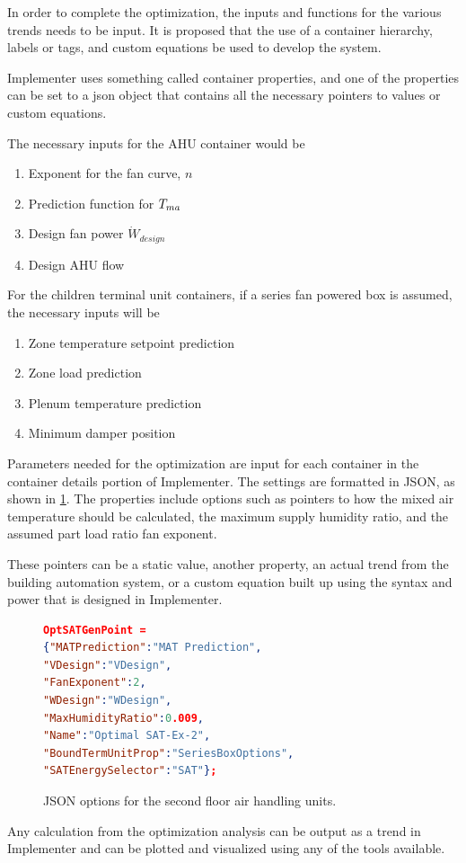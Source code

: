 In order to complete the optimization, the inputs and functions for the
various trends needs to be input. It is proposed that the use of a
container hierarchy, labels or tags, and custom equations be used to
develop the system.

Implementer uses something called container properties, and one of the
properties can be set to a json object that contains all the necessary
pointers to values or custom equations.

The necessary inputs for the AHU container would be 
\begin{enumerate}
    \item Exponent for the fan curve, \(n\)
    \item Prediction function for \(T_{ma}{}\) 
    \item Design fan power \(\dot{W}_{design}\)
    \item Design AHU flow 
\end{enumerate}
For the children terminal unit containers, if a series fan powered box
is assumed, the necessary inputs will be
\begin{enumerate}
    \item Zone temperature setpoint prediction
    \item Zone load prediction
    \item Plenum temperature prediction
    \item Minimum damper position
\end{enumerate}

Parameters needed for the optimization are input for each container in
the container details portion of Implementer. The settings are formatted
in JSON, as shown in \figref{} \ref{fig:JSONOptions}. The properties
include options such as pointers to how the mixed air temperature
should be calculated, the maximum supply humidity ratio, and the
assumed part load ratio fan exponent. 

These pointers can be a static value, another property, an actual
trend from the building automation system, or a custom equation built up
using the syntax and power that is designed in Implementer.

\begin{figure}
\centering
\begin{lstlisting}[language=json]
OptSATGenPoint = 
{"MATPrediction":"MAT Prediction",
"VDesign":"VDesign",
"FanExponent":2,
"WDesign":"WDesign",
"MaxHumidityRatio":0.009,
"Name":"Optimal SAT-Ex-2",
"BoundTermUnitProp":"SeriesBoxOptions",
"SATEnergySelector":"SAT"};
\end{lstlisting}
\label{fig:JSONOptions}
\caption{JSON options for the second floor air handling units. }
\end{figure}

Any calculation  from the optimization analysis can be output as a trend
in Implementer and can be plotted and visualized using any of the tools
available. 






